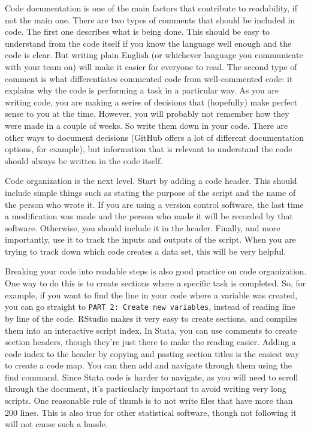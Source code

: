 Code documentation is one of the main factors that contribute to readability,
if not the main one.
There are two types of comments that should be included in code.
The first one describes what is being done.
This should be easy to understand from the code itself if you know the language well enough and the code is clear.
But writing plain English (or whichever language you communicate with your team on)
will make it easier for everyone to read.
The second type of comment is what differentiates commented code from well-commented code:
it explains why the code is performing a task in a particular way.
As you are writing code, you are making a series of decisions that
(hopefully) make perfect sense to you at the time.
However, you will probably not remember how they were made in a couple of weeks.
So write them down in your code.
There are other ways to document decisions
(GitHub offers a lot of different documentation options, for example),
but information that is relevant to understand the code should always be written in the code itself.

Code organization is the next level.
Start by adding a code header.
This should include simple things such as stating the purpose of the script and the name of the person who wrote it.
If you are using a version control software,
the last time a modification was made and the person who made it will be recorded by that software.
Otherwise, you should include it in the header.
Finally, and more importantly, use it to track the inputs and outputs of the script.
When you are trying to track down which code creates a data set, this will be very helpful.

Breaking your code into readable steps is also good practice on code organization.
One way to do this is to create sections where a specific task is completed.
So, for example, if you want to find the line in your code where a variable was created,
you can go straight to \texttt{PART 2: Create new variables},
instead of reading line by line of the code.
RStudio makes it very easy to create sections, and compiles them into an interactive script index.
In Stata, you can use comments to create section headers,
though they're just there to make the reading easier.
Adding a code index to the header by copying and pasting section titles is the easiest way to create a code map.
You can then add and navigate through them using the find command.
Since Stata code is harder to navigate, as you will need to scroll through the document,
it's particularly important to avoid writing very long scripts.
One reasonable rule of thumb is to not write files that have more than 200 lines.
This is also true for other statistical software,
though not following it will not cause such a hassle.

